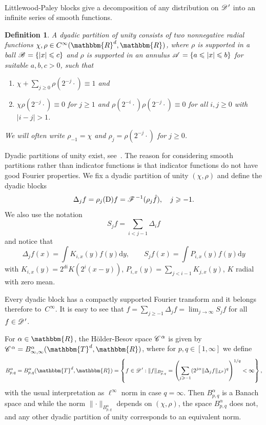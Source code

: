 \documentclass[11pt,reqno]{amsart}
\newcommand{\cdummy}{\cdot}
\newcommand{\mathD}{\mathrm{D}}
\newcommand{\mathd}{\mathrm{d}}
\newcommand{\nosymbol}{}
\newcommand{\tmtextit}[1]{{\itshape{#1}}}
\newtheorem{definition}[theorem]{Definition}
\newcommand{\CC}{\mathscr{C} \hspace{.1em}}
\newcommand{\CD}{\mathscr{D} \hspace{.1em}}
\newcommand{\CF}{\mathscr{F} \hspace{.1em}}
\newcommand{\CB}{\mathscr{B} \hspace{.1em}}
\newcommand{\CA}{\mathscr{A} \hspace{.1em}}
\newcommand{\DD}{\mathscr{D} \hspace{.1em}}
\begin{document}
\

Littlewood-Paley blocks give a decomposition of any distribution on $\CD'$
into an infinite series of smooth functions.

\begin{definition}
  A \tmtextit{dyadic partition of unity} consists of two nonnegative radial
  functions $\chi, \rho \in C^{\infty} (\mathbbm{R}^d, \mathbbm{R})$, where
  $\rho$ is supported in a ball $\CB = \{ | x | \leqslant c \}$ and $\rho$ is
  supported in an annulus $\CA = \{ a \leqslant | x | \leqslant b \}$ for
  suitable $a, b, c > 0$, such that
  \begin{enumerate}
    \item $\chi + \sum_{j \geqslant 0} \rho (2^{- j} \cdummy) \equiv 1$ and
    
    \item \label{property-2-dyadic}$\chi \rho (2^{- j} \cdummy) \equiv 0$ for
    $j \geqslant 1$ and $\rho (2^{- i} \cdummy) \rho (2^{- j} \nosymbol
    \cdummy) \equiv 0$ for all $i, j \geqslant 0$ with $| i - j | > 1$.
  \end{enumerate}
  We will often write $\rho_{- 1} = \chi$ and $\rho_j = \rho (2^{- j}
  \cdummy)$ for $j \geqslant 0$.
\end{definition}

Dyadic partitions of unity exist, see~{\cite{bahouri_fourier_2011}}. The
reason for considering smooth partitions rather than indicator functions is
that indicator functions do not have good Fourier properties. We fix a dyadic
partition of unity $(\chi, \rho)$ and define the dyadic blocks
\[ \Delta_j f = \rho_j (\mathD) f = \CF^{- 1} (\rho_j \hat{f}), \quad j
   \geqslant - 1. \]
We also use the notation
\[ S_j f = \sum_{i < j - 1} \Delta_i f \]
and notice that
\[ \Delta_j f (x) = \int K_{i, x} (y) f (y) \mathd y, \qquad S_j f (x) = \int
   P_{i, x} (y) f (y) \mathd y \]
with $K_{i, x} (y) = 2^{di} K (2^i (x - y))$, $P_{i, x} (y) = \sum_{j < i - 1}
K_{j, x} (y)$, $K$ radial with zero mean.

Every dyadic block has a compactly supported Fourier transform and it belongs
therefore to~$C^{\infty}$. It is easy to see that $f = \sum_{j \geqslant - 1}
\Delta_j f = \lim_{j \rightarrow \infty} S_j f$ for all $f \in \CD'$.

For $\alpha \in \mathbbm{R}$, the H{\"o}lder-Besov space $\CC^{\alpha}$ is
given by $\CC^{\alpha} = B^{\alpha}_{\infty, \infty} (\mathbbm{T}^d,
\mathbbm{R})$, where for $p, q \in [1, \infty]$ we define
\[ B^{\alpha}_{p, q} = B^{\alpha}_{p, q} (\mathbbm{T}^d, \mathbbm{R}) =
   \left\{ f \in \DD' : \|f\|_{B^{\alpha}_{p, q}} = \left( \sum_{j \geqslant -
   1} (2^{j \alpha} \| \Delta_j f\|_{L^p})^q \right)^{1 / q} < \infty
   \right\}, \]
with the usual interpretation as $\ell^{\infty}$ norm in case $q = \infty$.
Then $B^{\alpha}_{p, q}$ is a Banach space and while the norm $\lVert \cdummy
\rVert_{B^{\alpha}_{p, q}}$ depends on $(\chi, \rho)$, the space
$B^{\alpha}_{p, q}$ does not, and any other dyadic partition of unity
corresponds to an equivalent norm.
\end{document}
